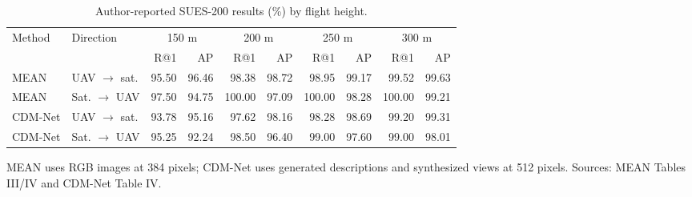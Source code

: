 \begin{table}[t]
\centering
\caption{Author-reported SUES-200 results (\%) by flight height.}
\label{tab:literature_sues}
\fontsize{9}{10.5}\selectfont
\setlength{\tabcolsep}{3.3pt}
\renewcommand{\arraystretch}{1.12}
\begin{tabular}{llrrrrrrrr}
\toprule
Method & Direction & \multicolumn{2}{c}{150 m} & \multicolumn{2}{c}{200 m} & \multicolumn{2}{c}{250 m} & \multicolumn{2}{c}{300 m} \\
\cmidrule(lr){3-4}\cmidrule(lr){5-6}\cmidrule(lr){7-8}\cmidrule(lr){9-10} & & R@1 & AP & R@1 & AP & R@1 & AP & R@1 & AP \\
\midrule
MEAN \cite{mean2025} & UAV $\rightarrow$ sat. & 95.50 & 96.46 & 98.38 & 98.72 & 98.95 & 99.17 & 99.52 & 99.63 \\
MEAN \cite{mean2025} & Sat. $\rightarrow$ UAV & 97.50 & 94.75 & 100.00 & 97.09 & 100.00 & 98.28 & 100.00 & 99.21 \\
CDM-Net \cite{cdmnet2025} & UAV $\rightarrow$ sat. & 93.78 & 95.16 & 97.62 & 98.16 & 98.28 & 98.69 & 99.20 & 99.31 \\
CDM-Net \cite{cdmnet2025} & Sat. $\rightarrow$ UAV & 95.25 & 92.24 & 98.50 & 96.40 & 99.00 & 97.60 & 99.00 & 98.01 \\
\bottomrule
\end{tabular}
\par\vspace{2pt}\begin{minipage}{\textwidth}\fontsize{9}{10.5}\selectfont MEAN uses RGB images at 384 pixels; CDM-Net uses generated descriptions and synthesized views at 512 pixels. Sources: MEAN Tables III/IV and CDM-Net Table IV.\end{minipage}
\end{table}
